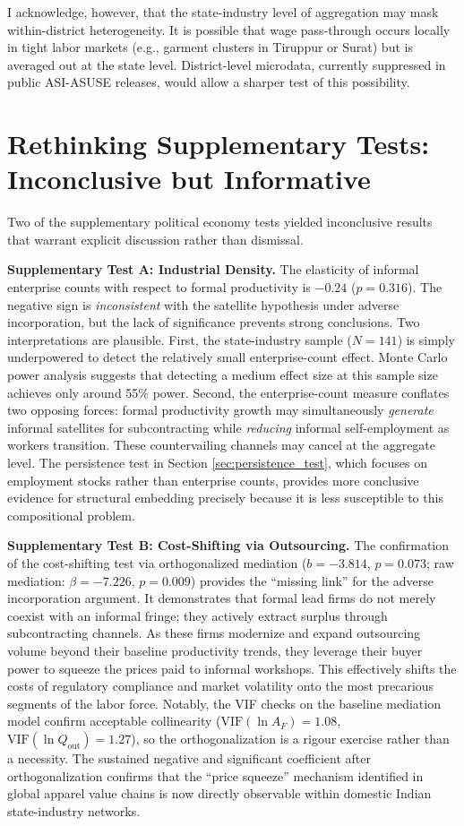 I acknowledge, however, that the state-industry level of aggregation may mask within-district heterogeneity. It is possible that wage pass-through occurs locally in tight labor markets (e.g., garment clusters in Tiruppur or Surat) but is averaged out at the state level. District-level microdata, currently suppressed in public ASI-ASUSE releases, would allow a sharper test of this possibility.

\section{Rethinking Supplementary Tests: Inconclusive but Informative}
\label{sec:inconclusive_tests}

Two of the supplementary political economy tests yielded inconclusive results that warrant explicit discussion rather than dismissal.

\textbf{Supplementary Test A: Industrial Density.} The elasticity of informal enterprise counts with respect to formal productivity is $-0.24$ ($p = 0.316$). The negative sign is \textit{inconsistent} with the satellite hypothesis under adverse incorporation, but the lack of significance prevents strong conclusions. Two interpretations are plausible. First, the state-industry sample ($N = 141$) is simply underpowered to detect the relatively small enterprise-count effect. Monte Carlo power analysis suggests that detecting a medium effect size at this sample size achieves only around 55\% power. Second, the enterprise-count measure conflates two opposing forces: formal productivity growth may simultaneously \textit{generate} informal satellites for subcontracting while \textit{reducing} informal self-employment as workers transition. These countervailing channels may cancel at the aggregate level. The persistence test in Section \ref{sec:persistence_test}, which focuses on employment stocks rather than enterprise counts, provides more conclusive evidence for structural embedding precisely because it is less susceptible to this compositional problem.

\textbf{Supplementary Test B: Cost-Shifting via Outsourcing.} The confirmation of the cost-shifting test via orthogonalized mediation ($b = -3.814$, $p = 0.073$; raw mediation: $\beta = -7.226$, $p = 0.009$) provides the ``missing link'' for the adverse incorporation argument. It demonstrates that formal lead firms do not merely coexist with an informal fringe; they actively extract surplus through subcontracting channels. As these firms modernize and expand outsourcing volume beyond their baseline productivity trends, they leverage their buyer power to squeeze the prices paid to informal workshops. This effectively shifts the costs of regulatory compliance and market volatility onto the most precarious segments of the labor force. Notably, the VIF checks on the baseline mediation model confirm acceptable collinearity ($\text{VIF}(\ln A_F)=1.08$, $\text{VIF}(\ln Q_{\text{out}})=1.27$), so the orthogonalization is a rigour exercise rather than a necessity. The sustained negative and significant coefficient after orthogonalization confirms that the ``price squeeze'' mechanism identified in global apparel value chains \autocite{Anner2020} is now directly observable within domestic Indian state-industry networks.

